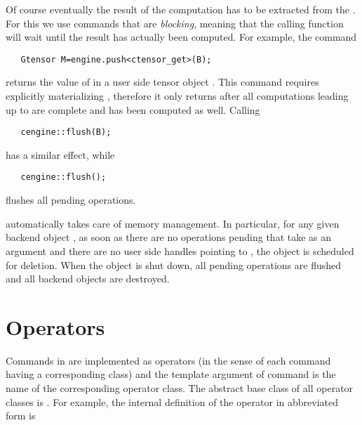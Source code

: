 
Of course eventually the result of the computation has to be extracted from the . 
For this we use commands that are \emph{blocking}, meaning that the calling function will  
wait until the result has actually been computed. For example, the command 

\texttt{~~~Gtensor M=engine.push<ctensor\_get>(B);}

returns the value of  in a user side tensor object . This command requires 
explicitly materializing , therefore it only returns after all computations leading up to  
are complete and  has been computed as well. Calling 

\texttt{~~~cengine::flush(B);}

has a similar effect, while 

\texttt{~~~cengine::flush();}

flushes all pending operations.  

\Cengine{} automatically takes care of memory management. In particular, 
for any given backend object , as soon as there are no operations pending that take  
as an argument and there are no user side handles pointing to , 
the object  is scheduled for deletion. 
When the  object is shut down, all pending 
operations are flushed and all backend objects are destroyed. 

\section*{Operators}

Commands in \Cengine{} are implemented as operators (in the sense of each command having a 
corresponding class) and the template argument of  
command is the name of the corresponding operator class. The abstract base class of all 
operator classes is .  
For example, the internal definition of the  operator in abbreviated form is 


